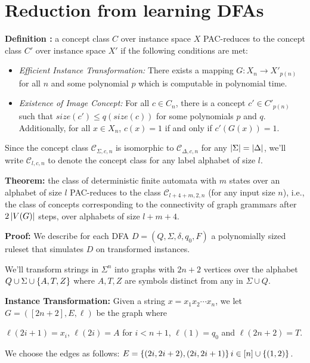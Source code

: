 \documentclass[]{article}
\providecommand{\tightlist}{%
  \setlength{\itemsep}{0pt}\setlength{\parskip}{0pt}}
\def\Concepts{\mathcal{C}\xspace}
\begin{document}
\section{Reduction from learning DFAs}

\textbf{Definition \cite{kearns1994}:} a concept class \(C\) over
instance space \(X\) PAC-reduces to the concept class \(C'\) over
instance space \(X'\) if the following conditions are met:

\begin{itemize}
\tightlist
\item
  \emph{Efficient Instance Transformation:} There exists a mapping
  \(G: X_n \to X'_{p(n)}\) for all \(n\) and some polynomial \(p\) which
  is computable in polynomial time.
\item
  \emph{Existence of Image Concept:} For all \(c \in C_n\), there is a
  concept \(c' \in C'_{p(n)}\) such that \(size(c') \leq q(size(c))\)
  for some polynomials \(p\) and \(q\). Additionally, for all
  \(x \in X_n\), \(c(x) = 1\) if and only if \(c'(G(x)) = 1\).
\end{itemize}

Since the concept class $\Concepts_{\Sigma,c,n}$ is isomorphic to $\Concepts_{\Delta,c,n}$ for any $\left| \Sigma \right| = \left| \Delta \right|$, we'll write $\Concepts_{l,c,n}$ to denote the concept class for any label alphabet of size $l$. 

\textbf{Theorem:} the class of deterministic finite automata with $m$ states
over an alphabet of size $l$ PAC-reduces to the class $\Concepts_{l+4+m,2,n}$ (for any input size $n$),
i.e., the class of concepts corresponding to the connectivity of graph grammars
after $2\left| V(G) \right|$ steps, over alphabets of size $l+m+4$.

\textbf{Proof:}
We describe for each DFA $D=(Q,\Sigma,\delta,q_0,F)$ a polynomially sized ruleset that
simulates \(D\) on transformed instances.

We'll transform strings in $\Sigma^n$ into graphs with $2n+2$ vertices over the alphabet $Q\cup\Sigma\cup \left\{ A,T,Z \right\}$ where $A,T,Z$ are symbols distinct from any in $\Sigma\cup Q$.

\textbf{Instance Transformation:} 
Given a string $x = x_1x_2\dotsm x_n$, we let $G = ([2n+2],E,\ell)$ be the graph where

$\ell(2i+1) = x_i$, $\ell(2i) = A$ for $i < n+1$, $\ell(1) = q_0$ and $\ell(2n+2) = T$.

We choose the edges as follows: $E = \left\{ (2i,2i+2),(2i,2i+1) \right\}{i\in [n]} \cup \left\{ (1,2) \right\}$.
\end{document}
